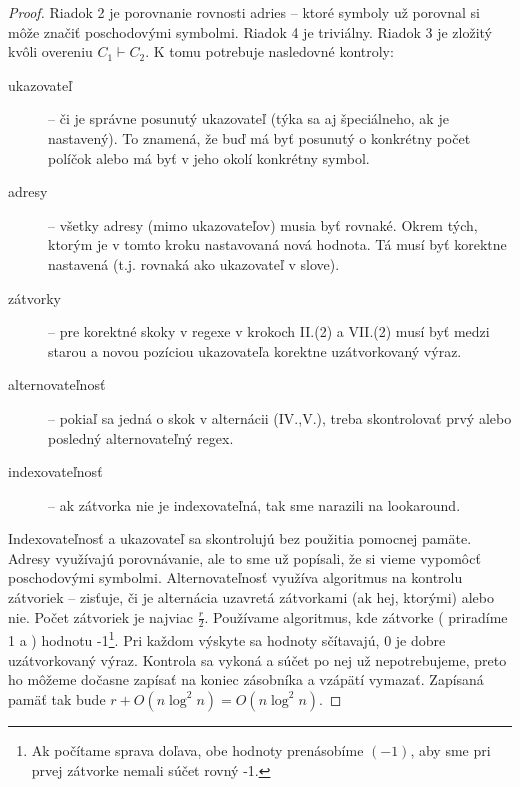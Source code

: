 \documentclass{svk_long_sk}
\begin{document}
\begin{proof}
Riadok 2 je porovnanie rovnosti adries -- ktoré symboly už porovnal si môže značiť poschodovými symbolmi. Riadok 4 je triviálny. Riadok 3 je zložitý kvôli overeniu $C_1\vdash C_2$. K tomu potrebuje nasledovné kontroly:
\begin{description}
\item[ukazovateľ] -- či je správne posunutý ukazovateľ (týka sa aj špeciálneho, ak je nastavený). To znamená, že buď má byť posunutý o konkrétny počet políčok alebo má byť v jeho okolí konkrétny symbol.
\item[adresy] -- všetky adresy (mimo ukazovateľov) musia byť rovnaké. Okrem tých, ktorým je v tomto kroku nastavovaná nová hodnota. Tá musí byť korektne nastavená (t.j. rovnaká ako ukazovateľ v slove). 
\item[zátvorky] -- pre korektné skoky v regexe v krokoch II.(2) a VII.(2) musí byť medzi starou a novou pozíciou ukazovateľa korektne uzátvorkovaný výraz.
\item[alternovateľnosť] -- pokiaľ sa jedná o skok v alternácii (IV.,V.), treba skontrolovať prvý alebo posledný alternovateľný regex.
\item[indexovateľnosť] -- ak zátvorka nie je indexovateľná, tak sme narazili na lookaround.
\end{description}
Indexovateľnosť a ukazovateľ sa skontrolujú bez použitia pomocnej pamäte. Adresy využívajú porovnávanie, ale to sme už popísali, že si vieme vypomôcť poschodovými symbolmi. Alternovateľnosť využíva algoritmus na kontrolu zátvoriek -- zisťuje, či je alternácia uzavretá zátvorkami (ak hej, ktorými) alebo nie. Počet zátvoriek je najviac $\frac{r}{2}$. Používame algoritmus, kde zátvorke ( priradíme 1 a ) hodnotu -1\footnote{Ak počítame sprava doľava, obe hodnoty prenásobíme $(-1)$, aby sme pri prvej zátvorke nemali súčet rovný -1.}. Pri každom výskyte sa hodnoty sčítavajú, 0 je dobre uzátvorkovaný výraz. Kontrola sa vykoná a súčet po nej už nepotrebujeme, preto ho môžeme dočasne zapísať na koniec zásobníka a vzápätí vymazať. Zapísaná pamäť tak bude $r+O(n\log^2n)=O(n\log^2n)$.
\end{proof}
\end{document}
